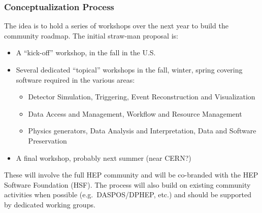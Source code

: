 \begin{frame}
\frametitle{Conceptualization Process}

The idea is to hold a series of workshops over the next year to build the community roadmap. The initial straw-man proposal is:

\begin{itemize}
\item A ``kick-off'' workshop, in the fall in the U.S.
\item Several dedicated ``topical'' workshops in the {fall, winter, spring} covering software required in the various areas:
\begin{itemize}
\item Detector Simulation, Triggering, Event Reconstruction and Visualization
\item Data Access and Management, Workflow and Resource Management
\item Physics generators, Data Analysis and Interpretation, Data and Software Preservation
\end{itemize}
\item A final workshop, probably next summer (near CERN?)
\end{itemize}

These will involve the full HEP community and will be co-branded with the HEP Software Foundation (HSF). The process will also build on existing community activities when possible (e.g.\ DASPOS/DPHEP, etc.) and should be supported by dedicated working groups.

\end{frame}


